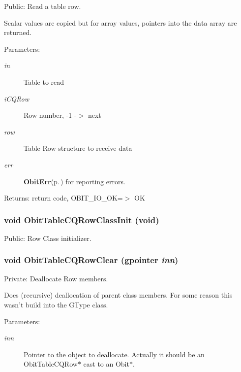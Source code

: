 Public: Read a table row. 

Scalar values are copied but for array values, pointers into the data array are returned. \begin{Desc}
\item[Parameters:]
\begin{description}
\item[{\em in}]Table to read \item[{\em i\-CQRow}]Row number, -1 -$>$ next \item[{\em row}]Table Row structure to receive data \item[{\em err}]{\bf Obit\-Err}{\rm (p.\,\pageref{structObitErr})} for reporting errors. \end{description}
\end{Desc}
\begin{Desc}
\item[Returns:]return code, OBIT\_\-IO\_\-OK=$>$ OK \end{Desc}
\subsubsection{\setlength{\rightskip}{0pt plus 5cm}void Obit\-Table\-CQRow\-Class\-Init (void)}\label{ObitTableCQ_8c_a26}


Public: Row Class initializer. 

\subsubsection{\setlength{\rightskip}{0pt plus 5cm}void Obit\-Table\-CQRow\-Clear (gpointer {\em inn})}\label{ObitTableCQ_8c_a7}


Private: Deallocate Row members. 

Does (recursive) deallocation of parent class members. For some reason this wasn't build into the GType class. \begin{Desc}
\item[Parameters:]
\begin{description}
\item[{\em inn}]Pointer to the object to deallocate. Actually it should be an Obit\-Table\-CQRow$\ast$ cast to an Obit$\ast$. \end{description}
\end{Desc}
